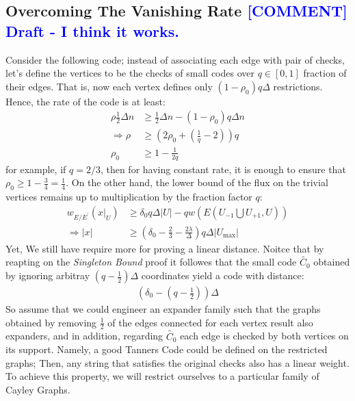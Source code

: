\documentclass{article}
\newcommand{\commentt}[1]{\textcolor{blue}{ \textbf{[COMMENT]} #1}}
\newcommand{\ctt}[1]{\commentt{#1}}
\begin{document}
\begin{multicols*}{2}
  \subsection { Overcoming The Vanishing Rate \ctt{ Draft - I think it works.} } 
  Consider the following code; instead of associating each edge with pair of checks, let's define the vertices to be the checks of small codes over $q \in [0,1]$ fraction of their edges. That is, now each vertex defines only $\left( 1 - \rho_{0} \right)q\Delta$ restrictions. Hence, the rate of the code is at least:   
  \begin{equation*}
    \begin{split}
      \rho\frac{1}{2}\Delta n & \ge \frac{1}{2}\Delta n - \left(1 - \rho_{0} \right)q\Delta n \\
      \Rightarrow \rho & \ge \left(  2\rho_{0} + \left( \frac{1}{q}  - 2  \right)  \right)q \\ 
      \rho_{0} & \ge  1 - \frac{1}{2q} 
    \end{split}
  \end{equation*} for example, if $q = 2/3$, then for having constant rate, it is enough to ensure that $ \rho_{0} \ge 1 - \frac{3}{4} = \frac{1}{4}$. On the other hand, the lower bound of the flux on the trivial vertices remains up to multiplication by the fraction factor $q$: 
  \begin{equation*}
    \begin{split}
      w_{E/E^{\prime}}\left( x|_{U} \right) & \ge  \delta_{0}q\Delta|U| -qw\left( E(U_{-1} \bigcup U_{+1} ,U)  \right) \\ 
      \Rightarrow |x| & \ge \left(  \delta_{0} - \frac{2}{3} - \frac{2\lambda}{\Delta} \right) q \Delta|U_{\max}|
    \end{split}
  \end{equation*}
  Yet, We still have require more for proving a linear distance. Noitce that by reapting on the \emph{Singleton Bound} proof it followes that the small code $\tilde{C_{0}}$ obtained by ignoring arbitray $ \left( q - \frac{1}{2} \right) \Delta $ coordinates yield a code with distance: 
  \begin{equation*}
    \begin{split}
      \left( \delta_{0} - \left( q - \frac{1}{2} \right) \right)\Delta
    \end{split}
  \end{equation*}
  So assume that we could engineer an expander family such that the graphs obtained by removing $\frac{1}{2}$ of the edges connected for each vertex result also expanders, and in addition, regarding $\tilde{C_{0}}$ each edge is checked by both vertices on its support. Namely, a good Tanners Code could be defined on the restricted graphs; Then, any string that satisfies the original checks also has a linear weight. To achieve this property, we will restrict ourselves to a particular family of Cayley Graphs.  

\end{multicols*}
\end{document}
